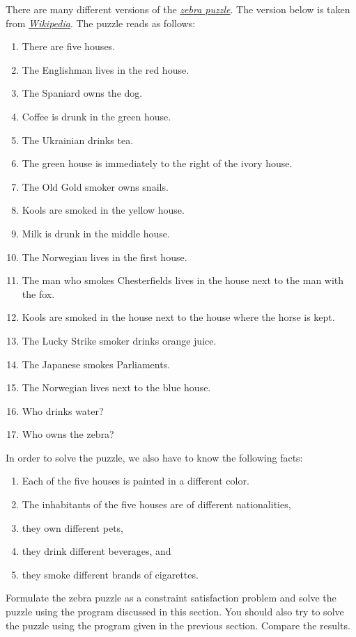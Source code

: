 \exercise
There are many different versions of the \href{https://en.wikipedia.org/wiki/Zebra_Puzzle}{\emph{zebra puzzle}}.  
The version below is taken from \href{https://en.wikipedia.org/wiki/Zebra_Puzzle}{\emph{Wikipedia}}.  The
puzzle reads as follows:
\begin{enumerate}
\item There are five houses.
\item The Englishman lives in the red house.
\item The Spaniard owns the dog.
\item Coffee is drunk in the green house.
\item The Ukrainian drinks tea.
\item The green house is immediately to the right of the ivory house.
\item The Old Gold smoker owns snails.
\item Kools are smoked in the yellow house.
\item Milk is drunk in the middle house.
\item The Norwegian lives in the first house.
\item The man who smokes Chesterfields lives in the house next to the man with the fox.
\item Kools are smoked in the house next to the house where the horse is kept.
\item The Lucky Strike smoker drinks orange juice.
\item The Japanese smokes Parliaments.
\item The Norwegian lives next to the blue house.
\item Who drinks water? 
\item Who owns the zebra?
\end{enumerate}
In order to solve the puzzle, we also have to know the following facts:
\begin{enumerate}
\item Each of the five houses is painted in a {\color{blue}different} color.
\item The inhabitants of the five houses are of {\color{blue}different} nationalities,
\item they own {\color{blue}different} pets, 
\item they drink {\color{blue}different} beverages, and 
\item they smoke {\color{blue}different} brands of cigarettes. 
\end{enumerate}
Formulate the zebra puzzle as a constraint satisfaction problem and solve the puzzle using the program
discussed in this section.  You should also try to solve the puzzle using the program given in the previous
section.  Compare the results.
\eoxs


